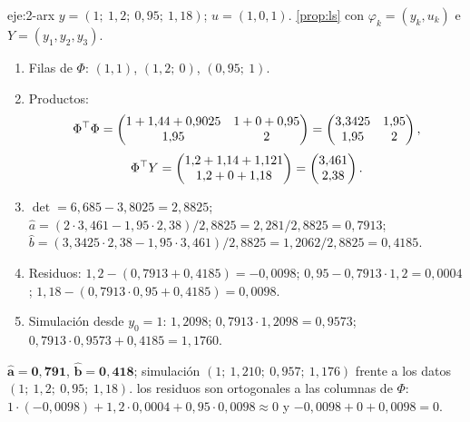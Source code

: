 \begin{solucion}{eje:2-arx}
\datos $y=(1;\ 1{,}2;\ 0{,}95;\ 1{,}18)$; $u=(1,0,1)$.
\planteamiento \cref{prop:ls} con $\varphi_k=(y_k,u_k)$ e $Y=(y_1,y_2,y_3)$.
\pasos
\begin{enumerate}[label=\arabic*.]
  \item Filas de $\Phi$: $(1,1)$, $(1{,}2;\ 0)$, $(0{,}95;\ 1)$.
  \item Productos:
  \[
  \Phi^{\top}\Phi=\begin{pmatrix}1+1{,}44+0{,}9025&1+0+0{,}95\\1{,}95&2\end{pmatrix}=\begin{pmatrix}3{,}3425&1{,}95\\1{,}95&2\end{pmatrix},
  \]
  \[
  \Phi^{\top} Y=\begin{pmatrix}1{,}2+1{,}14+1{,}121\\1{,}2+0+1{,}18\end{pmatrix}=\begin{pmatrix}3{,}461\\2{,}38\end{pmatrix}.
  \]
  \item $\det=6{,}685-3{,}8025=2{,}8825$; $\hat a=(2\cdot3{,}461-1{,}95\cdot2{,}38)/2{,}8825=2{,}281/2{,}8825=0{,}7913$; $\hat b=(3{,}3425\cdot2{,}38-1{,}95\cdot3{,}461)/2{,}8825=1{,}2062/2{,}8825=0{,}4185$.
  \item Residuos: $1{,}2-(0{,}7913+0{,}4185)=-0{,}0098$; $0{,}95-0{,}7913\cdot1{,}2=0{,}0004$; $1{,}18-(0{,}7913\cdot0{,}95+0{,}4185)=0{,}0098$.
  \item Simulación desde $y_0=1$: $1{,}2098$; $0{,}7913\cdot1{,}2098=0{,}9573$; $0{,}7913\cdot0{,}9573+0{,}4185=1{,}1760$.
\end{enumerate}
\resultado $\mathbf{\hat a=0{,}791}$, $\mathbf{\hat b=0{,}418}$; simulación $(1;\ 1{,}210;\ 0{,}957;\ 1{,}176)$ frente a los datos $(1;\ 1{,}2;\ 0{,}95;\ 1{,}18)$.
\comprobacion los residuos son ortogonales a las columnas de $\Phi$: $1\cdot(-0{,}0098)+1{,}2\cdot0{,}0004+0{,}95\cdot0{,}0098\approx0$ y $-0{,}0098+0+0{,}0098=0$.
\end{solucion}

